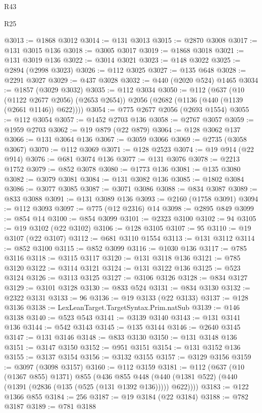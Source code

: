 \begin{lexlean}{R43}
\begin{lexlean}{R25}
\begin{coremodule}
{{{{{{{{{{{{{{{{{{{{{{{{{{{{{{{{{{{{{{{{{{{{{{{{{{{{{{{{{{{{{{{{{{{{{{{{{{{{{{{{{{{{{{{{{{{{{{{{{{{{{{{{{{{{{{{{{{{{{{{{{{{{{{{{{{{{{{{{{{{{{{{{{{{{{{{{{{{{{{{{{{{{{{{{{{{{{{{{{{{{{{{{{{{{{{{{{@3013 := @1868 @3012
@3014 := @131 @3013
@3015 := @2870 @3008
@3017 := @131 @3015 @136
@3018 := @3005 @3017
@3019 := @1868 @3018
@3021 := @131 @3019 @136
@3022 := @3014 @3021
@3023 := @148 @3022
@3025 := @2894 (@2998 @3023)
@3026 := @112 @3025
@3027 := @135 @648
@3028 := @2291 @3027
@3029 := @437 @3028
@3032 := @440 (@2020 @524) @1465
@3034 := @1857 (@3029 @3032)
@3035 := @112 @3034
@3050 := @112
    (@637
      (@10 (@1122 @2677 @2056) (@2653 @2654))
      @2056
      (@2682 (@1136 (@440 (@1139 (@2661 @1146)) @622))))
@3054 := @775 @2677 @2056 (@2693 @1554)
@3055 := @112 @3054
@3057 := @1452 @2703 @136
@3058 := @2767 @3057
@3059 := @1959 @2703
@3062 := @19 @879 (@22 @879)
@3064 := @128 @3062 @137
@3066 := @131 @3064 @136
@3067 := @3059 @3066
@3069 := @2735 (@3058 @3067)
@3070 := @112 @3069
@3071 := @128 @2523
@3074 := @19 @914 (@22 @914)
@3076 := @681 @3074 @136
@3077 := @131 @3076
@3078 := @2213 @1752
@3079 := @852 @3078
@3080 := @1773 @136
@3081 := @135 @3080
@3082 := @3079 @3081
@3084 := @131 @3082 @136
@3085 := @1802 @3084
@3086 := @3077 @3085
@3087 := @3071 @3086
@3088 := @834 @3087
@3089 := @833 @3088
@3091 := @131 @3089 @136
@3093 := @2160 (@1758 @3091)
@3094 := @112 @3093
@3097 := @775 (@12 @2316) @14
@3098 := @2895 @849
@3099 := @854 @14
@3100 := @854 @3099
@3101 := @2323 @3100
@3102 := 94
@3105 := @19 @3102 (@22 @3102)
@3106 := @128 @3105
@3107 := 95
@3110 := @19 @3107 (@22 @3107)
@3112 := @681 @3110 @1554
@3113 := @131 @3112
@3114 := @852 @3100
@3115 := @852 @3099
@3116 := @1030 @136
@3117 := @785 @3116
@3118 := @3115 @3117
@3120 := @131 @3118 @136
@3121 := @785 @3120
@3122 := @3114 @3121
@3124 := @131 @3122 @136
@3125 := @523 @3124
@3126 := @3113 @3125
@3127 := @3106 @3126
@3128 := @834 @3127
@3129 := @3101 @3128
@3130 := @833 @524
@3131 := @834 @3130
@3132 := @2322 @3131
@3133 := 96
@3136 := @19 @3133 (@22 @3133)
@3137 := @128 @3136
@3138 := LexLeanTarget.TargetSyntax.Prim.natSub
@3139 := @146 @3138
@3140 := @523 @543
@3141 := @3139 @3140
@3143 := @131 @3141 @136
@3144 := @542 @3143
@3145 := @135 @3144
@3146 := @2640 @3145
@3147 := @131 @3146
@3148 := @833 @3130
@3150 := @131 @3148 @136
@3151 := @3147 @3150
@3152 := @951 @3151
@3154 := @131 @3152 @136
@3155 := @3137 @3154
@3156 := @3132 @3155
@3157 := @3129 @3156
@3159 := @3097 (@3098 @3157)
@3160 := @112 @3159
@3181 := @112
    (@637
      (@10 (@1367 @855) @1371)
      @855
      (@436
        @855
        @448
        (@440 (@1381 @522) (@440 (@1391 (@2836 (@135 (@525 (@131 @1392 @136))))) @622))))
@3183 := @122 @1366 @855
@3184 := 256
@3187 := @19 @3184 (@22 @3184)
@3188 := @782 @3187
@3189 := @781 @3188
}}}}}}}}}}}}}}}}}}}}}}}}}}}}}}}}}}}}}}}}}}}}}}}}}}}}}}}}}}}}}}}}}}}}}}}}}}}}}}}}}}}}}}}}}}}}}}}}}}}}}}}}}}}}}}}}}}}}}}}}}}}}}}}}}}}}}}}}}}}}}}}}}}}}}}}}}}}}}}}}}}}}}}}}}}}}}}}}}}}}}}}}}}}}}}}}}
\end{coremodule}
\end{lexlean}
\end{lexlean}
